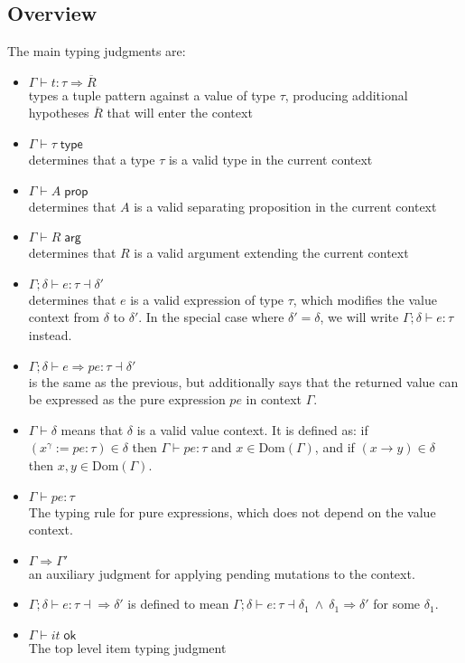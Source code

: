 \documentclass[acmsmall,nonacm]{acmart}
\newcommand{\proves}{\vdash}
\newcommand{\makes}{\dashv}
\newcommand{\constep}{\Rightarrow}
\newcommand{\makesto}{\dashv\!\constep}
\begin{document}
\subsection{Overview}

The main typing judgments are:

\begin{itemize}
  \item $\Gamma \proves t:\tau \Rightarrow \overline{R}$\\ types a tuple pattern against a value of type $\tau$, producing additional hypotheses $\overline{R}$ that will enter the context
  \item $\Gamma \proves \tau\;\mathsf{type}$\\ determines that a type $\tau$ is a valid type in the current context
  \item $\Gamma \proves A\;\mathsf{prop}$\\ determines that $A$ is a valid separating proposition in the current context
  \item $\Gamma \proves R\;\mathsf{arg}$\\ determines that $R$ is a valid argument extending the current context
  \item $\Gamma;\delta \proves e:\tau \makes\delta'$\\ determines that $e$ is a valid expression of type $\tau$, which modifies the value context from $\delta$ to $\delta'$. In the special case where $\delta'=\delta$, we will write $\Gamma;\delta \proves e:\tau$ instead.
  \item $\Gamma;\delta \proves e\Rightarrow pe:\tau \makes\delta'$\\ is the same as the previous, but additionally says that the returned value can be expressed as the pure expression $pe$ in context $\Gamma$.
  \item $\Gamma\proves \delta$ means that $\delta$ is a valid value context.
  It is defined as: if $(x^\gamma:=pe:\tau)\in\delta$ then $\Gamma\proves pe:\tau$ and $x\in\mathrm{Dom}(\Gamma)$, and if $(x\to y)\in\delta$ then $x,y\in\mathrm{Dom}(\Gamma)$.
  \item $\Gamma \proves pe:\tau$\\ The typing rule for pure expressions, which does not depend on the value context.
  \item $\Gamma \constep \Gamma'$\\ an auxiliary judgment for applying pending mutations to the context.
  \item $\Gamma;\delta \proves e:\tau\makesto\delta'$ is defined to mean $\Gamma;\delta \proves e:\tau\makes\delta_1\ \wedge\ \delta_1\constep\delta'$ for some $\delta_1$.
  \item $\Gamma\proves it\;\mathsf{ok}$\\ The top level item typing judgment
\end{itemize}
\end{document}
